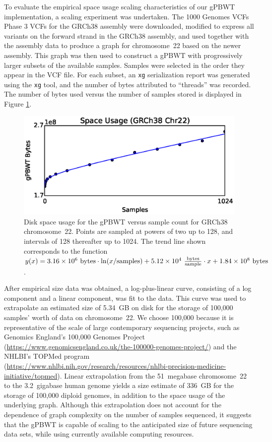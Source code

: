 To evaluate the empirical space usage scaling characteristics of our gPBWT implementation, a scaling experiment was undertaken. The 1000 Genomes VCFs Phase 3 VCFs for the GRCh38 assembly were downloaded, modified to express all variants on the forward strand in the GRCh38 assembly, and used together with the assembly data to produce a graph for chromosome~22 based on the newer assembly. This graph was then used to construct a gPBWT with progressively larger subsets of the available samples. Samples were selected in the order they appear in the VCF file. For each subset, an \texttt{xg} serialization report was generated using the \texttt{xg} tool, and the number of bytes attributed to ``threads'' was recorded. The number of bytes used versus the number of samples stored is displayed in Figure \ref{fig:scaling}.

\begin{figure}[h!]
\centering
\includegraphics[width=\linewidth]{figures/03_gpbwt/scaling.eps}
\caption{Disk space usage for the gPBWT versus sample count for GRCh38 chromosome~22. Points are sampled at powers of two up to 128, and intervals of 128 thereafter up to 1024. The trend line shown corresponds to the function $y(x) = \num{3.16E6}~\mathrm{bytes} \cdot \ln(x / \mathrm{samples}) + \num{5.12E4}~\frac{\mathrm{bytes}}{\mathrm{sample}} \cdot x + \num{1.84E8}~\mathrm{bytes}$.}
\label{fig:scaling}
\end{figure}

After empirical size data was obtained, a log-plus-linear curve, consisting of a log component and a linear component, was fit to the data. This curve was used to extrapolate an estimated size of 5.34~GB on disk for the storage of 100,000 samples' worth of data on chromosome~22. We choose 100,000 because it is representative of the scale of large contemporary sequencing projects, such as Genomics England's 100,000 Genomes Project (\url{https://www.genomicsengland.co.uk/the-100000-genomes-project/}) \cite{nothaft2015rethinking} and the NHLBI's TOPMed program (\url{https://www.nhlbi.nih.gov/research/resources/nhlbi-precision-medicine-initiative/topmed}). Linear extrapolation from the 51~megabase chromosome~22 to the 3.2~gigabase human genome yields a size estimate of 336~GB for the storage of 100,000 diploid genomes, in addition to the space usage of the underlying graph. Although this extrapolation does not account for the dependence of graph complexity on the number of samples sequenced, it suggests that the gPBWT is capable of scaling to the anticipated size of future sequencing data sets, while using currently available computing resources.

